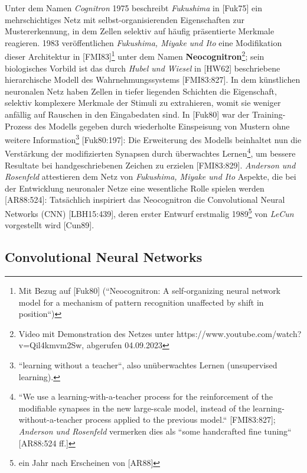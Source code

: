 Unter dem Namen \textit{Cognitron} 1975 beschreibt \textit{Fukushima} in [Fuk75] ein mehrschichtiges Netz mit selbst-organisierenden Eigenschaften zur Mustererkennung, in dem Zellen selektiv auf häufig präsentierte Merkmale reagieren.
1983 veröffentlichen \textit{Fukushima, Miyake und Ito} eine Modifikation dieser Architektur in [FMI83]\footnote{
    Mit Bezug auf [Fuk80] (``Neocognitron: A self-organizing neural network model for a mechanism of pattern recognition unaffected by shift in position``)
} unter dem Namen \textbf{Neocognitron}\footnote{
    Video mit Demonstration des Netzes unter https://www.youtube.com/watch?v=Qil4kmvm2Sw, abgerufen 04.09.2023
}; sein biologisches Vorbild ist das durch \textit{Hubel und Wiesel} in [HW62] beschriebene hierarchische Modell des Wahrnehmungssystems [FMI83:827].
In dem künstlichen neuronalen Netz haben Zellen in tiefer liegenden Schichten die Eigenschaft, selektiv komplexere Merkmale der Stimuli zu extrahieren, womit sie weniger anfällig auf Rauschen in den Eingabedaten sind.
In [Fuk80] war der Training-Prozess des Modells gegeben durch wiederholte Einspeisung von Mustern ohne weitere Information\footnote{
    ``learning without a teacher``, also unüberwachtes Lernen (unsupervised learning).
} [Fuk80:197]: Die Erweiterung des Modells beinhaltet nun die Verstärkung der modifizierten Synapsen durch überwachtes Lernen\footnote{
    ``We use a learning-with-a-teacher process for the reinforcement of the modifiable synapses in the new large-scale
model, instead of the learning-without-a-teacher process applied to the previous model.`` [FMI83:827]; \textit{Anderson und Rosenfeld} vermerken dies als ``some handcrafted fine tuning`` [AR88:524 ff.]
}, um bessere Resultate bei handgeschriebenen Zeichen zu erzielen [FMI83:829].
\textit{Anderson und Rosenfeld} attestieren dem Netz von \textit{Fukushima, Miyake und Ito} Aspekte, die bei der Entwicklung neuronaler Netze eine wesentliche Rolle spielen werden [AR88:524]:  Tatsächlich inspiriert das Neocognitron die Convolutional Neural Networks (CNN) [LBH15:439], deren erster Entwurf erstmalig 1989\footnote{
    ein Jahr nach Erscheinen von [AR88]
} von \textit{LeCun} vorgestellt wird [Cun89].



\subsection{Convolutional Neural Networks}

